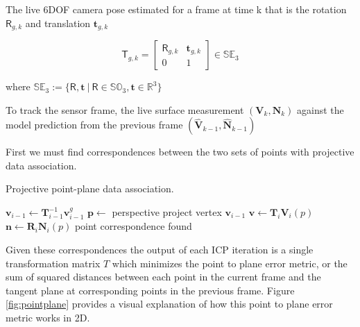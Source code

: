 \documentclass[10pt, twocolumn]{article}
\begin{document}
The live 6DOF camera pose estimated for a frame at time k that is the rotation $\mathsf{R}_{g,k}$ and translation $\mathbf{t}_{g,k}$

\begin{equation}
\mathsf{T}_{g,k} = 
\begin{bmatrix}
  \mathsf{R}_{g,k} & \mathbf{t}_{g,k} \\
  0 & 1
\end{bmatrix}
\in \mathbb{SE}_{3}
\end{equation}

where $\mathbb{SE}_{3} := \{\mathsf{R}, \mathbf{t}\ |\ \mathsf{R} \in \mathbb{SO}_{3}, \mathbf{t} \in \mathbb{R}^{3}\}$

\hfill \break

To track the sensor frame, the live surface measurement $(\mathbf{V}_{k}, \mathbf{N}_{k})$ against the model prediction from the previous frame $(\mathbf{\hat{V}}_{k-1}, \mathbf{\hat{N}}_{k-1})$

First we must find correspondences between the two sets of points with projective data association. 


\begin{algorithm}
\caption{Projective point-plane data association.}\label{euclid}
\begin{algorithmic}[1]
\State $\mathbf{v}_{i-1} \leftarrow \mathbf{T}^{-1}_{i-1} \mathbf{v}^{g}_{i-1}$
\State $\mathbf{p} \leftarrow$ perspective project vertex $\mathbf{v}_{i-1}$
\State $\mathbf{v} \leftarrow \mathbf{T}_i \mathbf{V}_i(p)$
\State $\mathbf{n} \leftarrow \mathbf{R}_i \mathbf{N}_i(p)$
\State point correspondence found
\EndIf
\EndIf
\EndIf
\EndFor
\end{algorithmic}
\end{algorithm}


Given these correspondences the output of each ICP iteration is a single transformation matrix $T$ which minimizes the point to plane error metric, or the sum of squared distances between each point in the current frame and the tangent plane at corresponding points in the previous frame. Figure \ref{fig:pointplane} \cite{Low04linearleast-squares} provides a visual explanation of how this point to plane error metric works in 2D.
\end{document}
